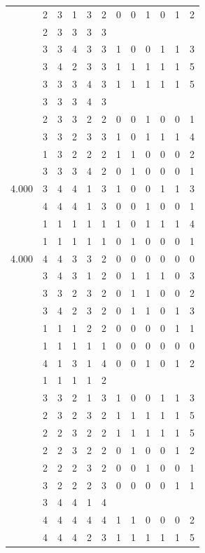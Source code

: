\documentclass[]{msu-thesis}
\theoremstyle{definition}
\theoremstyle{definition}
\theoremstyle{definition}
\theoremstyle{remark}
\begin{document}
\begin{table}
{\begin{tabular}[t]{rrrrrrrrrrrr}
 & 2 & 3 & 1 & 3 & 2 & 0 & 0 & 1 & 0 & 1 & 2\\
 & 2 & 3 & 3 & 3 & 3 &  &  &  &  &  & \\
 & 3 & 3 & 4 & 3 & 3 & 1 & 0 & 0 & 1 & 1 & 3\\
 & 3 & 4 & 2 & 3 & 3 & 1 & 1 & 1 & 1 & 1 & 5\\
 & 3 & 3 & 3 & 4 & 3 & 1 & 1 & 1 & 1 & 1 & 5\\
 & 3 & 3 & 3 & 4 & 3 &  &  &  &  &  & \\
 & 2 & 3 & 3 & 2 & 2 & 0 & 0 & 1 & 0 & 0 & 1\\
 & 3 & 3 & 2 & 3 & 3 & 1 & 0 & 1 & 1 & 1 & 4\\
 & 1 & 3 & 2 & 2 & 2 & 1 & 1 & 0 & 0 & 0 & 2\\
 & 3 & 3 & 3 & 4 & 2 & 0 & 1 & 0 & 0 & 0 & 1\\
4.000 & 3 & 4 & 4 & 1 & 3 & 1 & 0 & 0 & 1 & 1 & 3\\
 & 4 & 4 & 4 & 1 & 3 & 0 & 0 & 1 & 0 & 0 & 1\\
 & 1 & 1 & 1 & 1 & 1 & 1 & 0 & 1 & 1 & 1 & 4\\
 & 1 & 1 & 1 & 1 & 1 & 0 & 1 & 0 & 0 & 0 & 1\\
4.000 & 4 & 4 & 3 & 3 & 2 & 0 & 0 & 0 & 0 & 0 & 0\\
 & 3 & 4 & 3 & 1 & 2 & 0 & 1 & 1 & 1 & 0 & 3\\
 & 3 & 3 & 2 & 3 & 2 & 0 & 1 & 1 & 0 & 0 & 2\\
 & 3 & 4 & 2 & 3 & 2 & 0 & 1 & 1 & 0 & 1 & 3\\
 & 1 & 1 & 1 & 2 & 2 & 0 & 0 & 0 & 0 & 1 & 1\\
 & 1 & 1 & 1 & 1 & 1 & 0 & 0 & 0 & 0 & 0 & 0\\
 & 4 & 1 & 3 & 1 & 4 & 0 & 0 & 1 & 0 & 1 & 2\\
 & 1 & 1 & 1 & 1 & 2 &  &  &  &  &  & \\
 & 3 & 3 & 2 & 1 & 3 & 1 & 0 & 0 & 1 & 1 & 3\\
 & 2 & 3 & 2 & 3 & 2 & 1 & 1 & 1 & 1 & 1 & 5\\
 & 2 & 2 & 3 & 2 & 2 & 1 & 1 & 1 & 1 & 1 & 5\\
 & 2 & 2 & 3 & 2 & 2 & 0 & 1 & 0 & 0 & 1 & 2\\
 & 2 & 2 & 2 & 3 & 2 & 0 & 0 & 1 & 0 & 0 & 1\\
 & 3 & 2 & 2 & 2 & 3 & 0 & 0 & 0 & 0 & 1 & 1\\
 & 3 & 4 & 4 & 1 & 4 &  &  &  &  &  & \\
 & 4 & 4 & 4 & 4 & 4 & 1 & 1 & 0 & 0 & 0 & 2\\
 & 4 & 4 & 4 & 2 & 3 & 1 & 1 & 1 & 1 & 1 & 5\\

\end{tabular}}
\end{table}
\end{document}
